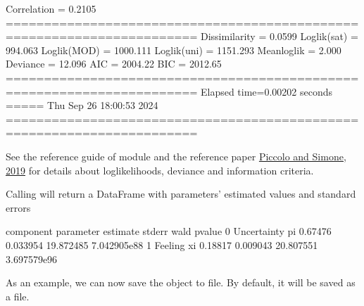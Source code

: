 \documentclass[letterpaper,10pt,english]{sphinxmanual}
\begin{document}
\begin{sphinxVerbatim}[commandchars=\\\{\}]
Correlation   = 0.2105
=======================================================================
Dissimilarity = 0.0599
Loglik(sat)   = \PYGZhy{}994.063
Loglik(MOD)   = \PYGZhy{}1000.111
Loglik(uni)   = \PYGZhy{}1151.293
Mean\PYGZhy{}loglik   = \PYGZhy{}2.000
Deviance      = 12.096
\PYGZhy{}\PYGZhy{}\PYGZhy{}\PYGZhy{}\PYGZhy{}\PYGZhy{}\PYGZhy{}\PYGZhy{}\PYGZhy{}\PYGZhy{}\PYGZhy{}\PYGZhy{}\PYGZhy{}\PYGZhy{}\PYGZhy{}\PYGZhy{}\PYGZhy{}\PYGZhy{}\PYGZhy{}\PYGZhy{}\PYGZhy{}\PYGZhy{}\PYGZhy{}\PYGZhy{}\PYGZhy{}\PYGZhy{}\PYGZhy{}\PYGZhy{}\PYGZhy{}\PYGZhy{}\PYGZhy{}\PYGZhy{}\PYGZhy{}\PYGZhy{}\PYGZhy{}\PYGZhy{}\PYGZhy{}\PYGZhy{}\PYGZhy{}\PYGZhy{}\PYGZhy{}\PYGZhy{}\PYGZhy{}\PYGZhy{}\PYGZhy{}\PYGZhy{}\PYGZhy{}\PYGZhy{}\PYGZhy{}\PYGZhy{}\PYGZhy{}\PYGZhy{}\PYGZhy{}\PYGZhy{}\PYGZhy{}\PYGZhy{}\PYGZhy{}\PYGZhy{}\PYGZhy{}\PYGZhy{}\PYGZhy{}\PYGZhy{}\PYGZhy{}\PYGZhy{}\PYGZhy{}\PYGZhy{}\PYGZhy{}\PYGZhy{}\PYGZhy{}\PYGZhy{}\PYGZhy{}
AIC = 2004.22
BIC = 2012.65
=======================================================================
Elapsed time=0.00202 seconds =====\PYGZgt{}\PYGZgt{}\PYGZgt{} Thu Sep 26 18:00:53 2024
=======================================================================
\end{sphinxVerbatim}

\noindent{}

\begin{DUlineblock}{0em}
\item[] 
\end{DUlineblock}

\sphinxAtStartPar
See  the reference guide
of  module and the reference paper
\hyperlink{cite.references:id3}{Piccolo and Simone, 2019}
for details about log\sphinxhyphen{}likelihoods,
deviance and information criteria.

\sphinxAtStartPar
Calling  will return a DataFrame with
parameters’ estimated values and standard errors

\begin{sphinxVerbatim}[commandchars=\\\{\}]
     component parameter  estimate    stderr       wald        pvalue
0  Uncertainty        pi   0.67476  0.033954  19.872485  7.042905e\PYGZhy{}88
1      Feeling        xi   0.18817  0.009043  20.807551  3.697579e\PYGZhy{}96
\end{sphinxVerbatim}
\label{\detokenize{manual:save-load-example}}
\sphinxAtStartPar
As an example, we can now save the  object to file. By default,
it will be saved as a  file.
\def\sphinxLiteralBlockLabel{\label{\detokenize{manual:id42}}}
\begin{sphinxVerbatim}[commandchars=\\\{\},numbers=left,firstnumber=1,stepnumber=1]
\end{sphinxVerbatim}
\end{document}
